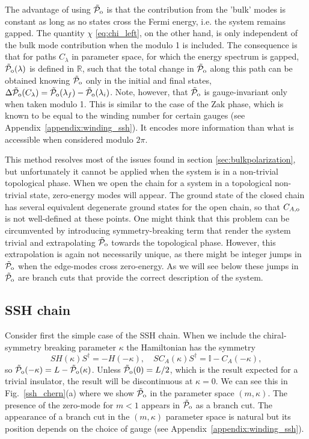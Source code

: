 \documentclass[twocolumn,amsmath,longbibliography,amssymb,superscriptaddress]{revtex4-1}
\newcommand{\tpo}{\tilde{\mathcal{P}}_{\rm o}}
\begin{document}
The advantage of using $\tpo$ is that the contribution from the 'bulk' modes is constant as long as no states cross the Fermi energy, i.e. the system remains gapped.  
The quantity $\chi$ \eqref{eq:chi_left}, on the other hand, is only independent of the bulk mode contribution when the modulo 1 is included. 
The consequence is that for paths $C_\lambda$ in parameter space, for which the energy spectrum is gapped, $\tpo (\lambda)$ is defined in $\mathbb{R}$, such that the total change in $\tpo$ along this path can be obtained knowing $\tpo$ only in the initial and final states, $\Delta \tpo ({C_\lambda}) = \tpo(\lambda_f) - \tpo(\lambda_i)$. Note, however, that $\tpo$ is gauge-invariant only when taken modulo 1. This is similar to the case of the Zak phase, which is known to be equal to the winding number for certain gauges (see Appendix~\ref{appendix:winding_ssh}). It encodes more information than what is accessible when considered modulo $2\pi$.

This method resolves most of the issues found in section \ref{sec:bulkpolarization}, but unfortunately it cannot be applied when the system is in a non-trivial topological phase. When we open the chain for a system in a topological non-trivial state, zero-energy modes will appear. The ground state of the closed chain has several equivalent degenerate ground states for the open chain, so that $C_{A,\rm o}$ is not well-defined at these points. 
One might think that this problem can be circumvented by introducing symmetry-breaking term that render the system trivial and extrapolating $\tpo$ towards the topological phase. 
However, this extrapolation is again not necessarily unique, as there might be integer jumps in $\tpo$ when the edge-modes cross zero-energy. 
As we will see below these jumps in $\tpo$ are branch cuts that provide the correct description of the system. 


\subsection{SSH chain}

Consider first the simple case of the SSH chain. When we include the chiral-symmetry breaking parameter $\kappa$ the Hamiltonian has the symmetry
\begin{equation}\label{eq:sym}
SH(\kappa)S^\dagger = -H(-\kappa), \quad S C_A(\kappa) S^\dagger = \mathbb{I}-C_A(-\kappa),
\end{equation}
so $\tpo(-\kappa) = L-\tpo(\kappa)$. Unless $\tpo(0) = L/2$, which is the result expected for a trivial insulator, the result will be discontinuous at $\kappa = 0$. We can see this in Fig.~\ref{ssh_chern}(a) where we show $\tpo$ in the parameter space $(m,\kappa)$. The presence of the zero-mode for $m<1$ appears in $\tpo$ as a branch cut. The appearance of a branch cut in the $(m,\kappa)$ parameter space is natural but its position depends on the choice of gauge (see Appendix~\ref{appendix:winding_ssh}).
\end{document}
